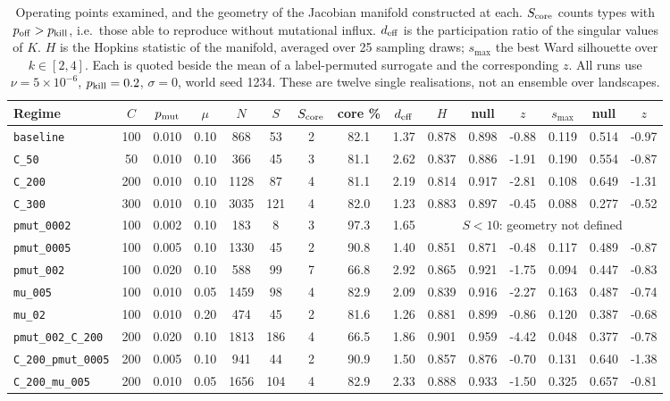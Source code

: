 \begin{table}
\caption{\label{tab:grid}Operating points examined, and the geometry of the
Jacobian manifold constructed at each.  $S_{\rm core}$ counts types with
$p_{\rm off}>p_{\rm kill}$, i.e.\ those able to reproduce without mutational
influx.  $d_{\rm eff}$ is the participation ratio of the singular values of $K$.
$H$ is the Hopkins statistic of the manifold, averaged over 25 sampling draws;
$s_{\max}$ the best Ward silhouette over $k\in[2,4]$.  Each is quoted beside the
mean of a label-permuted surrogate and the corresponding $z$.  All runs use
$\nu=5\times10^{-6}$, $p_{\rm kill}=0.2$, $\sigma=0$, world seed 1234.
These are twelve single realisations, not an ensemble over landscapes.}
\begin{ruledtabular}
\begin{tabular}{lccc ccccc cc c cc c}
Regime & $C$ & $p_{\rm mut}$ & $\mu$ & $N$ & $S$ & $S_{\rm core}$ & core \% &
$d_{\rm eff}$ & $H$ & null & $z$ & $s_{\max}$ & null & $z$ \\ \hline
\texttt{baseline} & 100 & 0.010 & 0.10 & 868 & 53 & 2 & 82.1 & 1.37 & 0.878 & 0.898 & -0.88 & 0.119 & 0.514 & -0.97 \\
\texttt{C\_50} & 50 & 0.010 & 0.10 & 366 & 45 & 3 & 81.1 & 2.62 & 0.837 & 0.886 & -1.91 & 0.190 & 0.554 & -0.87 \\
\texttt{C\_200} & 200 & 0.010 & 0.10 & 1128 & 87 & 4 & 81.1 & 2.19 & 0.814 & 0.917 & -2.81 & 0.108 & 0.649 & -1.31 \\
\texttt{C\_300} & 300 & 0.010 & 0.10 & 3035 & 121 & 4 & 82.0 & 1.23 & 0.883 & 0.897 & -0.45 & 0.088 & 0.277 & -0.52 \\
\texttt{pmut\_0002} & 100 & 0.002 & 0.10 & 183 & 8 & 3 & 97.3 & 1.65 & \multicolumn{6}{c}{$S<10$: geometry not defined} \\
\texttt{pmut\_0005} & 100 & 0.005 & 0.10 & 1330 & 45 & 2 & 90.8 & 1.40 & 0.851 & 0.871 & -0.48 & 0.117 & 0.489 & -0.87 \\
\texttt{pmut\_002} & 100 & 0.020 & 0.10 & 588 & 99 & 7 & 66.8 & 2.92 & 0.865 & 0.921 & -1.75 & 0.094 & 0.447 & -0.83 \\
\texttt{mu\_005} & 100 & 0.010 & 0.05 & 1459 & 98 & 4 & 82.9 & 2.09 & 0.839 & 0.916 & -2.27 & 0.163 & 0.487 & -0.74 \\
\texttt{mu\_02} & 100 & 0.010 & 0.20 & 474 & 45 & 2 & 81.6 & 1.26 & 0.881 & 0.899 & -0.86 & 0.120 & 0.387 & -0.68 \\
\texttt{pmut\_002\_C\_200} & 200 & 0.020 & 0.10 & 1813 & 186 & 4 & 66.5 & 1.86 & 0.901 & 0.959 & -4.42 & 0.048 & 0.377 & -0.78 \\
\texttt{C\_200\_pmut\_0005} & 200 & 0.005 & 0.10 & 941 & 44 & 2 & 90.9 & 1.50 & 0.857 & 0.876 & -0.70 & 0.131 & 0.640 & -1.38 \\
\texttt{C\_200\_mu\_005} & 200 & 0.010 & 0.05 & 1656 & 104 & 4 & 82.9 & 2.33 & 0.888 & 0.933 & -1.50 & 0.325 & 0.657 & -0.81 \\
\end{tabular}
\end{ruledtabular}
\end{table}